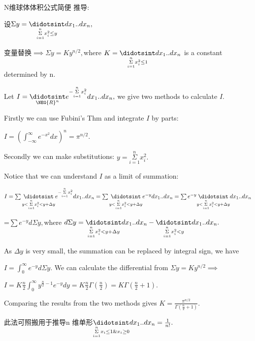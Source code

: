 \documentclass{ctexart}
\begin{document}
\begin{CJK}{GBK}{song}
N维球体体积公式简便%
推导:

设$\Sigma y=\underset{\underset{i=1}{\overset{n}{\Sigma }}%
x_{i}^{2}\leq y}{\didotsint }dx_{1}..dx_{n},$

变量替换$\implies \Sigma y=Ky^{n/2},$where $K=%
\underset{\underset{i=1}{\overset{n}{\Sigma }}x_{i}^{2}\leq 1}{\didotsint }%
dx_{1}..dx_{n}$ is a constant determined by n.

Let $I=\underset{\NEG{R}^{n}}{\didotsint }e^{-\underset{i=1}{\overset{n}{%
\Sigma }}x_{i}^{2}}dx_{1}..dx_{n},$ we give two methods to calculate $I.$

Firstly we can use Fubini's Thm and integrate $I$ by parts:

$I=\left( \int_{-\infty }^{\infty }e^{-x^{2}}dx\right) ^{n}=\pi ^{n/2}.$

Secondly we can make substitutions: $y=\underset{i=1}{\overset{n}{\Sigma }}%
x_{i}^{2}.$

Notice that we can understand $I$ as a limit of summation:

$I=\sum \underset{y<\underset{i=1}{\overset{n}{\Sigma }}x_{i}^{2}<y+\Delta y}%
{\didotsint }e^{-\underset{i=1}{\overset{n}{\Sigma }}%
x_{i}^{2}}dx_{1}..dx_{n}=\sum \underset{y<\underset{i=1}{\overset{n}{\Sigma }%
}x_{i}^{2}<y+\Delta y}{\didotsint }e^{-y}dx_{1}..dx_{n}=\sum e^{-y}\underset{%
y<\underset{i=1}{\overset{n}{\Sigma }}x_{i}^{2}<y+\Delta y}{\didotsint }%
dx_{1}..dx_{n}$

=$\sum e^{-y}d\Sigma y,$where $d\Sigma y=\underset{\underset{i=1}{\overset{n}%
{\Sigma }}x_{i}^{2}<y+\Delta y}{\didotsint }dx_{1}..dx_{n}-\underset{%
\underset{i=1}{\overset{n}{\Sigma }}x_{i}^{2}<y}{\didotsint }dx_{1}..dx_{n}.$

As $\Delta y$ is very small, the summation can be replaced by integral sign,
we have

$I=\int_{0}^{\infty }e^{-y}d\Sigma y.$ We can calculate the differential
from $\Sigma y=Ky^{n/2}\implies $

$I=K\frac{n}{2}\int_{0}^{\infty }y^{\frac{n}{2}-1}e^{-y}dy=K\frac{n}{2}%
\Gamma \left( \frac{n}{2}\right) =K\Gamma \left( \frac{n}{2}+1\right) .$

Comparing the results from the two methods gives $K=\frac{\pi ^{n/2}}{\Gamma
\left( \frac{n}{2}+1\right) }.$

此法可照搬用于推导n%
维单形$\underset{\underset{i=1}{\overset{n}{\Sigma }}%
x_{i}\leq 1\&x_{i}\geq 0}{\didotsint }dx_{1}..dx_{n}=\frac{1}{n!}.$


\end{CJK}
\end{document}
